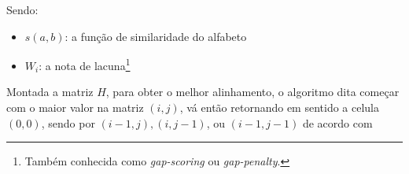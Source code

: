 Sendo:
\begin{itemize}
	\item $s(a,b)$: a função de similaridade do alfabeto
	\item $W_i$: a nota de lacuna\footnote{Também conhecida como \textit{gap-scoring} ou \textit{gap-penalty}.}
\end{itemize}

Montada a matriz $H$, para obter o melhor alinhamento, o algoritmo dita começar com o maior valor na matriz $(i,j)$, vá então retornando em sentido a celula $(0,0)$, sendo por $(i - 1,j), (i, j - 1)$, ou $(i - 1, j - 1)$ de acordo com 


